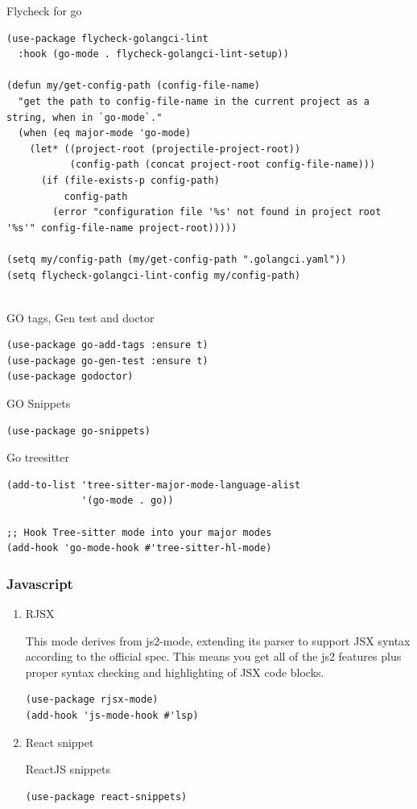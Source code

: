 \documentclass[11pt]{article}
\begin{document}
Flycheck for go

\begin{verbatim}
(use-package flycheck-golangci-lint
  :hook (go-mode . flycheck-golangci-lint-setup))

(defun my/get-config-path (config-file-name)
  "get the path to config-file-name in the current project as a string, when in `go-mode`."
  (when (eq major-mode 'go-mode)
    (let* ((project-root (projectile-project-root))
           (config-path (concat project-root config-file-name)))
      (if (file-exists-p config-path)
          config-path
        (error "configuration file '%s' not found in project root '%s'" config-file-name project-root)))))

(setq my/config-path (my/get-config-path ".golangci.yaml"))
(setq flycheck-golangci-lint-config my/config-path)


\end{verbatim}

GO tags, Gen test and doctor

\begin{verbatim}
(use-package go-add-tags :ensure t)
(use-package go-gen-test :ensure t)
(use-package godoctor)
\end{verbatim}

GO Snippets

\begin{verbatim}
(use-package go-snippets)
\end{verbatim}

Go treesitter

\begin{verbatim}
(add-to-list 'tree-sitter-major-mode-language-alist
             '(go-mode . go))

;; Hook Tree-sitter mode into your major modes
(add-hook 'go-mode-hook #'tree-sitter-hl-mode)
\end{verbatim}

\subsubsection{Javascript}
\label{sec:orgc30ed11}
\begin{enumerate}
\item RJSX
\label{sec:orgdeee99e}

This mode derives from js2-mode, extending its parser to support JSX syntax according to the official spec. This means you get all of the js2 features plus proper syntax checking and highlighting of JSX code blocks.

\begin{verbatim}
(use-package rjsx-mode)
(add-hook 'js-mode-hook #'lsp)
\end{verbatim}

\item React snippet
\label{sec:org17293c3}

ReactJS snippets

\begin{verbatim}
(use-package react-snippets)
\end{verbatim}
\end{enumerate}
\end{document}
